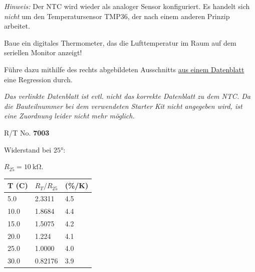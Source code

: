 \emph{Hinweis:} Der NTC wird wieder als analoger Sensor konfiguriert. Es handelt sich \emph{nicht} um den Temperatursensor TMP36, der nach einem anderen Prinzip arbeitet.

\medskip
\begin{projekt}\label{proj:thermometer}
	\begin{minipage}{0.58\textwidth}
		Baue ein digitales Thermometer, das die Lufttemperatur im Raum auf dem seriellen Monitor anzeigt!
		
		\bigskip
		Führe dazu mithilfe des rechts abgebildeten Ausschnitts \href{https://pdf1.alldatasheet.com/datasheet-pdf/view/509832/EPCOS/G1541.html}{aus einem Datenblatt} eine Regression durch.
		
		\bigskip
		\textit{\small Das verlinkte Datenblatt ist evtl. nicht das korrekte Datenblatt zu dem NTC. Da die Bauteilnummer bei dem verwendeten Starter Kit nicht angegeben wird, ist eine Zuordnung leider nicht mehr möglich.}
		
		\vspace{\baselineskip}
	\end{minipage}
	\hfill
	\begin{minipage}{0.38\textwidth}
		\begin{tcolorbox}
			R/T No. \textbf{7003}
			
			Widerstand bei $\ang{25}$: 
			
			$R_{25}=\SI{10}{\kilo\ohm}$.\\			
			
			\begin{tabular}{l | l | l}
				T (C) & $R_T/R_{25}$ & (\%/K) \\ \hline
				5.0 & 2.3311 & 4.5 \\ \hline
				10.0 & 1.8684 & 4.4  \\ \hline
				15.0 & 1.5075 &  4.2 \\ \hline
				20.0 & 1.224 & 4.1 \\ \hline
				25.0 & 1.0000 & 4.0 \\ \hline
				30.0 & 0.82176 & 3.9 \\ \hline
			\end{tabular}
		\end{tcolorbox}
	\end{minipage}
\end{projekt}

